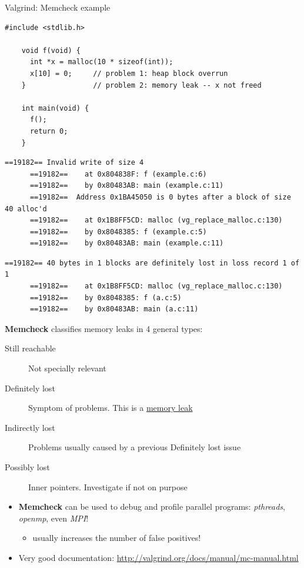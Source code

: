 \documentclass[10pt,xcolor=table]{beamer}
\begin{document}
\begin{frame}[fragile]{Valgrind: Memcheck example}
  \begin{lstlisting}[gobble=2]
    #include <stdlib.h>

    void f(void) {
      int *x = malloc(10 * sizeof(int));
      x[10] = 0;     // problem 1: heap block overrun
    }                // problem 2: memory leak -- x not freed

    int main(void) {
      f();
      return 0;
    }
  \end{lstlisting}

  \begin{overprint}
    \begin{lstlisting}[style=valgrind,gobble=6,caption={Valgrind output: Memcheck error}]
      ==19182== Invalid write of size 4
      ==19182==    at 0x804838F: f (example.c:6)
      ==19182==    by 0x80483AB: main (example.c:11)
      ==19182==  Address 0x1BA45050 is 0 bytes after a block of size 40 alloc'd
      ==19182==    at 0x1B8FF5CD: malloc (vg_replace_malloc.c:130)
      ==19182==    by 0x8048385: f (example.c:5)
      ==19182==    by 0x80483AB: main (example.c:11)
    \end{lstlisting}

    \begin{lstlisting}[style=valgrind,gobble=6,
      caption={Valgrind output: Memory leaks messages}]
      ==19182== 40 bytes in 1 blocks are definitely lost in loss record 1 of 1
      ==19182==    at 0x1B8FF5CD: malloc (vg_replace_malloc.c:130)
      ==19182==    by 0x8048385: f (a.c:5)
      ==19182==    by 0x80483AB: main (a.c:11)
    \end{lstlisting}

    {\bf Memcheck} classifies memory leaks in 4 general types:
    \begin{description}
    \item[Still reachable] Not specially relevant
    \item[Definitely lost] Symptom of problems. This is a
      \underline{memory leak}
    \item[Indirectly lost] Problems usually caused by a previous
      Definitely lost issue
    \item[Possibly lost] Inner pointers. Investigate if not on purpose
    \end{description}

    \begin{itemize}
    \item {\bf Memcheck} can be used to debug and profile parallel
      programs: \emph{pthreads}, \emph{openmp}, even \emph{MPI}!
      \begin{itemize}
      \item usually increases the number of false positives!
      \end{itemize}
    \item Very good documentation: {\small \url{http://valgrind.org/docs/manual/mc-manual.html}}
    \end{itemize}
  \end{overprint}

\end{frame}
\end{document}
